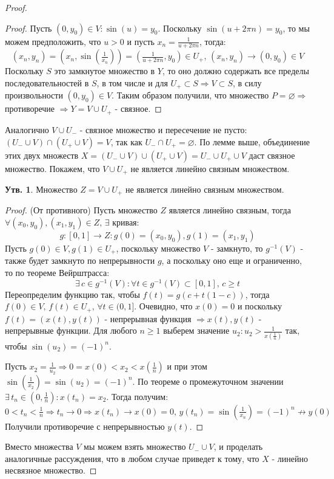 \documentclass[12pt]{article}
\newcommand{\VN}{\varnothing}
\theoremstyle{definition}
\newtheorem{prop}{Утв.}
\begin{document}
\begin{proof}
\begin{proof}
		Пусть $(0,y_0) \in V \colon \sin{(u)} = y_0$. Поскольку $\sin{(u + 2\pi n)} = y_0$, то мы можем предположить, что $u > 0$ и пусть $x_n = \tfrac{1}{u+ 2 \pi n}$, тогда: 
		$$
			(x_n, y_n) = (x_n, \sin{(\tfrac{1}{x_n})}) = (\tfrac{1}{u + 2\pi n},y_0) \in U_+, \, (x_n, y_n) \to (0, y_0) \in V
		$$
		Поскольку $S$ это замкнутое множество в $Y$, то оно должно содержать все пределы последовательностей в $S$, в том числе и для $U_+ \subset S \Rightarrow V \subset S$, в силу произвольности $(0,y_0) \in V$.
		Таким образом получили, что множество $P = \VN \Rightarrow$ противоречие $\Rightarrow Y = V \cup U_+$ - связное.
	\end{proof}
	Аналогично $V \cup U_{-}$ - связное множество и пересечение не пусто: $(U_- \cup V) \cap (U_+ \cup V) = V$, так как $U_- \cap U_+ = \VN$.
	По лемме выше, объединение этих двух множеств $X = (U_- \cup V) \cup (U_+ \cup V) = U_- \cup U_+ \cup V$ даст связное множество. Покажем, что $V \cup U_+$ не является линейно связным множеством.
	\begin{prop}
		Множество $Z = V \cup U_+$ не является линейно связным множеством.
	\end{prop}
	\begin{proof}
		(От противного) Пусть множество $Z$ является линейно связным, тогда $\forall (x_0, y_0), (x_1,y_1) \in Z, \, \exists$ кривая:
		$$
			g \colon [0,1] \to Z \colon g(0) = (x_0,y_0), g(1) = (x_1,y_1)
		$$ 
		Пусть $g(0) \in V, g(1) \in U_+$, поскольку множество $V$ - замкнуто, то $g^{-1}(V)$ - также будет замкнуто по непрерывности $g$, а поскольку оно еще и ограниченно, то по теореме Вейрштрасса:
		$$
			\exists \, c \in g^{-1}(V) \colon \forall t \in g^{-1}(V) \subset [0,1], \, c \geq t
		$$ 
		Переопределим функцию так, чтобы $f(t) = g(c + t(1-c))$, тогда $f(0) \in V,  \, f(t) \in U_+, \, \forall t \in (0,1]$. Очевидно, что $x(0) = 0$ и поскольку $f(t) = (x(t),y(t))$ - непрерывная функция $\Rightarrow x(t), y(t)$ - непрерывные функции. Для любого $n \geq 1$ выберем значение $u_2 \colon u_2 > \tfrac{1}{x(\tfrac{1}{n})}$ так, чтобы $\sin{(u_2)} = (-1)^n$. 
		
		Пусть $x_2 = \tfrac{1}{u_2} \Rightarrow 0 = x(0) < x_2  < x(\tfrac{1}{n})$ и при этом $\sin(\tfrac{1}{x_2}) = \sin{(u_2)} = (-1)^n$. По теореме о промежуточном значении $\exists \, t_n \in (0, \tfrac{1}{n}) \colon x(t_n) = x_2$. Тогда получим:
		$$
			0 < t_n < \tfrac{1}{n} \Rightarrow t_n \to 0 \Rightarrow x(t_n) \to x(0) = 0, \, y(t_n) = \sin{(\tfrac{1}{x_n})} = (-1)^n \nrightarrow y(0)
		$$
		Получили противоречие с непрерывностью $y(t)$.
	\end{proof}
	Вместо множества $V$ мы можем взять множество $U_- \cup V$, и проделать аналогичные рассуждения, что в любом случае приведет к тому, что $X$ - линейно несвязное множество.
\end{proof}
	
\end{document}
